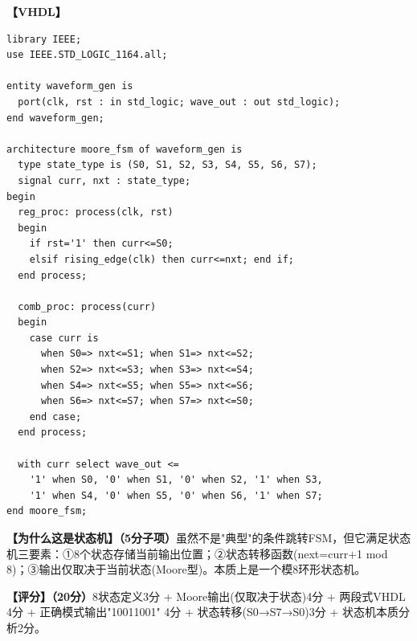 \textbf{【VHDL】}
\begin{lstlisting}
library IEEE;
use IEEE.STD_LOGIC_1164.all;

entity waveform_gen is
  port(clk, rst : in std_logic; wave_out : out std_logic);
end waveform_gen;

architecture moore_fsm of waveform_gen is
  type state_type is (S0, S1, S2, S3, S4, S5, S6, S7);
  signal curr, nxt : state_type;
begin
  reg_proc: process(clk, rst)
  begin
    if rst='1' then curr<=S0;
    elsif rising_edge(clk) then curr<=nxt; end if;
  end process;

  comb_proc: process(curr)
  begin
    case curr is
      when S0=> nxt<=S1; when S1=> nxt<=S2;
      when S2=> nxt<=S3; when S3=> nxt<=S4;
      when S4=> nxt<=S5; when S5=> nxt<=S6;
      when S6=> nxt<=S7; when S7=> nxt<=S0;
    end case;
  end process;

  with curr select wave_out <=
    '1' when S0, '0' when S1, '0' when S2, '1' when S3,
    '1' when S4, '0' when S5, '0' when S6, '1' when S7;
end moore_fsm;
\end{lstlisting}

\textbf{【为什么这是状态机】（5分子项）}虽然不是"典型"的条件跳转FSM，但它满足状态机三要素：①8个状态存储当前输出位置；②状态转移函数(next=curr+1 mod 8)；③输出仅取决于当前状态(Moore型)。本质上是一个模8环形状态机。

\textbf{【评分】（20分）}8状态定义3分 + Moore输出(仅取决于状态)4分 + 两段式VHDL 4分 + 正确模式输出"10011001" 4分 + 状态转移(S0→S7→S0)3分 + 状态机本质分析2分。
